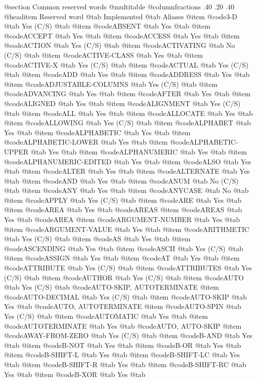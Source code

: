 @section Common reserved words
@multitable @columnfractions .40 .20 .40
@headitem Reserved word @tab Implemented @tab Aliases
@item @code{3-D} @tab Yes	(C/S) @tab 
@item @code{ABSENT} @tab Yes @tab 
@item @code{ACCEPT} @tab Yes @tab 
@item @code{ACCESS} @tab Yes @tab 
@item @code{ACTION} @tab Yes	(C/S) @tab 
@item @code{ACTIVATING} @tab No	(C/S) @tab 
@item @code{ACTIVE-CLASS} @tab Yes @tab 
@item @code{ACTIVE-X} @tab Yes	(C/S) @tab 
@item @code{ACTUAL} @tab Yes	(C/S) @tab 
@item @code{ADD} @tab Yes @tab 
@item @code{ADDRESS} @tab Yes @tab 
@item @code{ADJUSTABLE-COLUMNS} @tab Yes	(C/S) @tab 
@item @code{ADVANCING} @tab Yes @tab 
@item @code{AFTER} @tab Yes @tab 
@item @code{ALIGNED} @tab Yes @tab 
@item @code{ALIGNMENT} @tab Yes	(C/S) @tab 
@item @code{ALL} @tab Yes @tab 
@item @code{ALLOCATE} @tab Yes @tab 
@item @code{ALLOWING} @tab Yes	(C/S) @tab 
@item @code{ALPHABET} @tab Yes @tab 
@item @code{ALPHABETIC} @tab Yes @tab 
@item @code{ALPHABETIC-LOWER} @tab Yes @tab 
@item @code{ALPHABETIC-UPPER} @tab Yes @tab 
@item @code{ALPHANUMERIC} @tab Yes @tab 
@item @code{ALPHANUMERIC-EDITED} @tab Yes @tab 
@item @code{ALSO} @tab Yes @tab 
@item @code{ALTER} @tab Yes @tab 
@item @code{ALTERNATE} @tab Yes @tab 
@item @code{AND} @tab Yes @tab 
@item @code{ANUM} @tab No	(C/S) @tab 
@item @code{ANY} @tab Yes @tab 
@item @code{ANYCASE} @tab No @tab 
@item @code{APPLY} @tab Yes	(C/S) @tab 
@item @code{ARE} @tab Yes @tab 
@item @code{AREA} @tab Yes @tab @code{AREAS}
@item @code{AREAS} @tab Yes @tab @code{AREA}
@item @code{ARGUMENT-NUMBER} @tab Yes @tab 
@item @code{ARGUMENT-VALUE} @tab Yes @tab 
@item @code{ARITHMETIC} @tab Yes	(C/S) @tab 
@item @code{AS} @tab Yes @tab 
@item @code{ASCENDING} @tab Yes @tab 
@item @code{ASCII} @tab Yes	(C/S) @tab 
@item @code{ASSIGN} @tab Yes @tab 
@item @code{AT} @tab Yes @tab 
@item @code{ATTRIBUTE} @tab Yes	(C/S) @tab 
@item @code{ATTRIBUTES} @tab Yes	(C/S) @tab 
@item @code{AUTHOR} @tab Yes	(C/S) @tab 
@item @code{AUTO} @tab Yes	(C/S) @tab @code{AUTO-SKIP, AUTOTERMINATE}
@item @code{AUTO-DECIMAL} @tab Yes	(C/S) @tab 
@item @code{AUTO-SKIP} @tab Yes @tab @code{AUTO, AUTOTERMINATE}
@item @code{AUTO-SPIN} @tab Yes	(C/S) @tab 
@item @code{AUTOMATIC} @tab Yes @tab 
@item @code{AUTOTERMINATE} @tab Yes @tab @code{AUTO, AUTO-SKIP}
@item @code{AWAY-FROM-ZERO} @tab Yes	(C/S) @tab 
@item @code{B-AND} @tab Yes @tab 
@item @code{B-NOT} @tab Yes @tab 
@item @code{B-OR} @tab Yes @tab 
@item @code{B-SHIFT-L} @tab Yes @tab 
@item @code{B-SHIFT-LC} @tab Yes @tab 
@item @code{B-SHIFT-R} @tab Yes @tab 
@item @code{B-SHIFT-RC} @tab Yes @tab 
@item @code{B-XOR} @tab Yes @tab 
